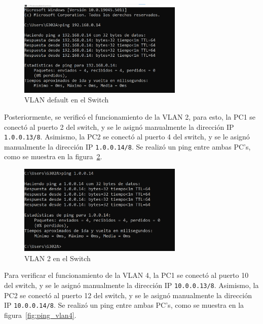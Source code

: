         \begin{figure}[H]
            \centering
            \includegraphics[width=0.7\textwidth]{img/ping_default.png}
            \caption{VLAN default en el Switch}
            \label{fig:ping_default}
        \end{figure}

        Posteriormente, se verificó el funcionamiento de la VLAN 2, para esto, la PC1 se conectó al puerto 2 del switch, y se le asignó manualmente la dirección IP \texttt{1.0.0.13/8}. Asimismo, la PC2 se conectó al puerto 4 del switch, y se le asignó manualmente la dirección IP \texttt{1.0.0.14/8}. Se realizó un ping entre ambas PC's, como se muestra en la figura~\ref{fig:ping_vlan2}.

        \begin{figure}[H]
            \centering
            \includegraphics[width=0.7\textwidth]{img/ping_vlan2.png}
            \caption{VLAN 2 en el Switch}
            \label{fig:ping_vlan2}
        \end{figure}

        Para verificar el funcionamiento de la VLAN 4, la PC1 se conectó al puerto 10 del switch, y se le asignó manualmente la dirección IP \texttt{10.0.0.13/8}. Asimismo, la PC2 se conectó al puerto 12 del switch, y se le asignó manualmente la dirección IP \texttt{10.0.0.14/8}. Se realizó un ping entre ambas PC's, como se muestra en la figura~\ref{fig:ping_vlan4}.

